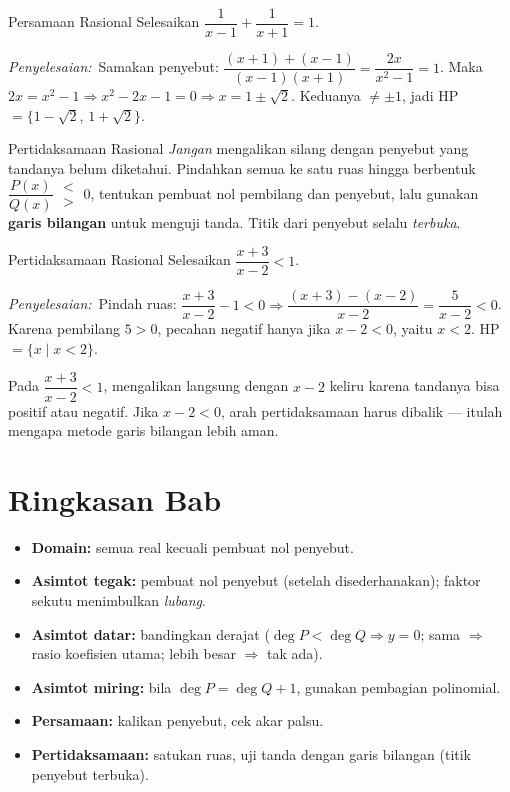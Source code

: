 \documentclass[11pt,a4paper]{report}
\theoremstyle{gaya}
\newcommand{\jawab}{\par\smallskip\noindent\textit{\textcolor{oranye}{Penyelesaian:}}\ }
\begin{document}
\begin{contoh}{Persamaan Rasional}
Selesaikan $\dfrac{1}{x-1}+\dfrac{1}{x+1}=1$.

\jawab Samakan penyebut: $\dfrac{(x+1)+(x-1)}{(x-1)(x+1)}=\dfrac{2x}{x^2-1}=1$. Maka $2x=x^2-1\Rightarrow x^2-2x-1=0\Rightarrow x=1\pm\sqrt2$. Keduanya $\neq\pm1$, jadi HP $=\{1-\sqrt2,\,1+\sqrt2\}$.
\end{contoh}

\begin{konsep}{Pertidaksamaan Rasional}
\emph{Jangan} mengalikan silang dengan penyebut yang tandanya belum diketahui. Pindahkan semua ke satu ruas hingga berbentuk $\dfrac{P(x)}{Q(x)}\;\substack{<\\>}\;0$, tentukan pembuat nol pembilang dan penyebut, lalu gunakan \textbf{garis bilangan} untuk menguji tanda. Titik dari penyebut selalu \emph{terbuka}.
\end{konsep}

\begin{contoh}{Pertidaksamaan Rasional}
Selesaikan $\dfrac{x+3}{x-2}<1$.

\jawab Pindah ruas: $\dfrac{x+3}{x-2}-1<0\Rightarrow\dfrac{(x+3)-(x-2)}{x-2}=\dfrac{5}{x-2}<0$. Karena pembilang $5>0$, pecahan negatif hanya jika $x-2<0$, yaitu $x<2$. HP $=\{x\mid x<2\}$.
\end{contoh}

\begin{kesalahan}
Pada $\dfrac{x+3}{x-2}<1$, mengalikan langsung dengan $x-2$ keliru karena tandanya bisa positif atau negatif. Jika $x-2<0$, arah pertidaksamaan harus dibalik --- itulah mengapa metode garis bilangan lebih aman.
\end{kesalahan}

\section*{Ringkasan Bab}
\begin{itemize}[leftmargin=*,topsep=2pt]
  \item \textbf{Domain:} semua real kecuali pembuat nol penyebut.
  \item \textbf{Asimtot tegak:} pembuat nol penyebut (setelah disederhanakan); faktor sekutu menimbulkan \emph{lubang}.
  \item \textbf{Asimtot datar:} bandingkan derajat ($\deg P<\deg Q\Rightarrow y=0$; sama $\Rightarrow$ rasio koefisien utama; lebih besar $\Rightarrow$ tak ada).
  \item \textbf{Asimtot miring:} bila $\deg P=\deg Q+1$, gunakan pembagian polinomial.
  \item \textbf{Persamaan:} kalikan penyebut, cek akar palsu.
  \item \textbf{Pertidaksamaan:} satukan ruas, uji tanda dengan garis bilangan (titik penyebut terbuka).
\end{itemize}
\end{document}
